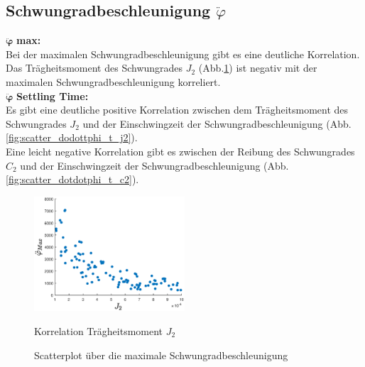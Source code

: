 \subsection*{Schwungradbeschleunigung $\ddot\varphi$}
$\bm{\ddot\varphi}$ \textbf{max: }\\
Bei der maximalen Schwungradbeschleunigung gibt es eine deutliche Korrelation.
Das Trägheitsmoment des Schwungrades $J_2$ (Abb.\ref{fig:scatter_dotdotphi_max_j2}) ist negativ mit der maximalen Schwungradbeschleunigung korreliert.\\

$\bm{\ddot\varphi}$ \textbf{Settling Time: }\\
Es gibt eine deutliche positive Korrelation zwischen dem Trägheitsmoment des Schwungrades $J_2$ und der Einschwingzeit der Schwungradbeschleunigung (Abb. \ref{fig:scatter_dodottphi_t_j2}).\\
Eine leicht negative Korrelation gibt es zwischen der Reibung des Schwungrades $C_2$ und der Einschwingzeit der Schwungradbeschleunigung (Abb. \ref{fig:scatter_dotdotphi_t_c2}).\\
\begin{figure}
    \centering
        \centering
        \includegraphics[width=0.5\textwidth]{Bilder/5_sensi/cm/dotdot_phi_max_J2.eps}
        \caption{Korrelation Trägheitsmoment $J_2$}
        \label{fig:scatter_dotdotphi_max_j2}
    \caption{Scatterplot über die maximale Schwungradbeschleunigung}
\end{figure}

